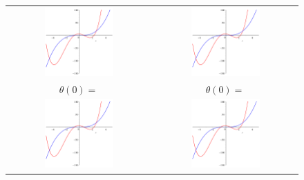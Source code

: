 \documentclass[11pt]{article} %
\begin{document}
\begin{figure}
\begin{tabular}{c c}
\includegraphics[width=0.5\textwidth]{problem1plot2.png} &   \includegraphics[width=0.5\textwidth]{problem1plot2.png} \\
$\theta(0) = $ & $\theta(0) = $ \\[6pt]
 \includegraphics[width=0.5\textwidth]{problem1plot2.png} &   \includegraphics[width=0.5\textwidth]{problem1plot2.png}\\

\end{tabular}
\end{figure}
\end{document}
